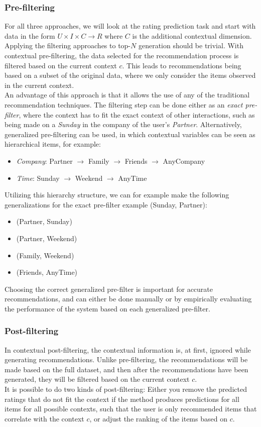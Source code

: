 \subsubsection*{Pre-filtering}
For all three approaches, we will look at the rating prediction task and start with data in the form $U \times I \times C \rightarrow R$ where $C$ is the additional contextual dimension.\\
Applying the filtering approaches to top-$N$ generation should be trivial.
With contextual pre-filtering, the data selected for the recommendation process is filtered based on the current context $c$.
This leads to recommendations being based on a subset of the original data, where we only consider the items observed in the current context.\\
An advantage of this approach is that it allows the use of any of the traditional recommendation techniques\cite{Adomavicius2011}.
The filtering step can be done either as an \textit{exact pre-filter}, where the context has to fit the exact context of other interactions, such as being made on a \textit{Sunday} in the company of the user's \textit{Partner}.
Alternatively, generalized pre-filtering can be used\cite{Adomavicius2011}, in which contextual variables can be seen as hierarchical items, for example:
\begin{itemize}
	\item \textit{Company}: Partner $\rightarrow$ Family $\rightarrow$ Friends $\rightarrow$ AnyCompany
	\item \textit{Time}: Sunday $\rightarrow$ Weekend $\rightarrow$ AnyTime
\end{itemize}
Utilizing this hierarchy structure, we can for example make the following generalizations for the exact pre-filter example (Sunday, Partner):
\begin{itemize}
	\item (Partner, Sunday)
	\item (Partner, Weekend)
	\item (Family, Weekend)
	\item (Friends, AnyTime)
\end{itemize}
Choosing the correct generalized pre-filter is important for accurate recommendations, and can either be done manually or by empirically evaluating the performance of the system based on each generalized pre-filter.

\subsubsection*{Post-filtering}
In contextual post-filtering, the contextual information is, at first, ignored while generating recommendations.
Unlike pre-filtering, the recommendations will be made based on the full dataset, and then after the recommendations have been generated, they will be filtered based on the current context $c$.\\
It is possible to do two kinds of post-filtering: Either you remove the predicted ratings that do not fit the context if the method produces predictions for all items for all possible contexts, such that the user is only recommended items that correlate with the context $c$, or adjust the ranking of the items based on $c$.

